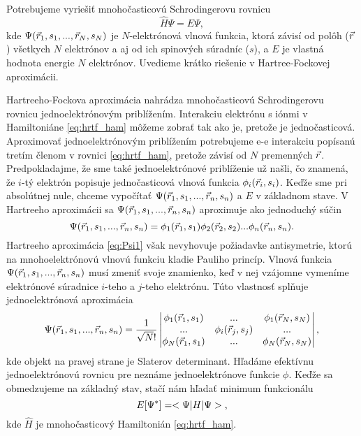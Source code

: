 Potrebujeme vyriešiť mnohočasticovú Schrodingerovu rovnicu
\begin{equation}
\label{eq:mohocasticovaschr}
\hat{H} \Psi = E \Psi,
\end{equation}
kde $\Psi(\vec{r}_1,s_1,...,\vec{r}_N,s_N)$ je $N$-elektrónová vlnová funkcia, ktorá závisí od polôh ($\vec{r}$) všetkych $N$ elektrónov
a aj od ich spinových súradníc ($s$), a $E$ je vlastná hodnota energie $N$ elektrónov. Uvedieme krátko riešenie v Hartree-Fockovej aproximácii.




Hartreeho-Fockova aproximácia nahrádza mnohočasticovú Schrodingerovu rovnicu jednoelektrónovým priblížením.
Interakciu elektrónu s iónmi v Hamiltoniáne \eqref{eq:hrtf_ham} môžeme zobrať tak ako je, pretože je jednočasticová.
Aproximovať jednoelektrónovým priblížením potrebujeme e-e interakciu popísanú tretím členom v rovnici \eqref{eq:hrtf_ham}, pretože závisí od $N$ premenných $\vec{r}$.
Predpokladajme, že sme také jednoelektrónové priblíženie už našli, čo znamená, že $i$-tý elektrón popisuje jednočasticová vlnová funkcia
$\phi_i(\vec{r}_i,s_i)$. Keďže sme pri absolútnej nule, chceme vypočítať $\Psi(\vec{r}_1,s_1,...,\vec{r}_n,s_n)$ a $E$  v základnom stave.
V Hartreeho aproximácii sa $\Psi(\vec{r}_1,s_1,...,\vec{r}_n,s_n)$ aproximuje ako jednoduchý súčin
\begin{equation}
\label{eq:Psi1}
\Psi(\vec{r}_1,s_1,...,\vec{r}_n,s_n)=\phi_1(\vec{r}_1,s_1)\phi_2(\vec{r}_2,s_2)...\phi_n(\vec{r}_n,s_n) \text{.}
\end{equation}
Hartreeho aproximácia \eqref{eq:Psi1} však nevyhovuje požiadavke antisymetrie, ktorú na mnohoelektrónovú vlnovú funkciu kladie Pauliho princíp.
Vlnová funkcia $\Psi(\vec{r}_1,s_1,...,\vec{r}_n,s_n)$ musí zmeniť svoje znamienko,
keď v nej vzájomne vymeníme elektrónové súradnice $i$-teho a $j$-teho elektrónu. Túto vlastnosť splňuje jednoelektrónová aproximácia
\begin{equation}
\label{eq:slatter}
\Psi(\vec{r}_1,s_1,...,\vec{r}_n,s_n)=\frac{1}{\sqrt N!}
\begin{vmatrix}
\phi_1(\vec{r}_1,s_1)& ... & \phi_1(\vec{r}_N,s_N) \\
...& \phi_i(\vec{r}_j,s_j)& ... \\
\phi_N(\vec{r}_1,s_1)& ... & \phi_N(\vec{r}_N,s_N)
\end{vmatrix}
\text{,}
\end{equation}
kde objekt na pravej strane je Slaterov determinant. Hľadáme efektívnu jednoelektrónovú rovnicu pre neznáme jednoelektrónove funkcie $\phi$.
Keďže sa obmedzujeme na základný stav,
stačí nám hľadať minimum funkcionálu
\begin{equation}
\label{eq:erg_func}
E[\Psi^*]=<\Psi|H|\Psi>\text{,}
\end{equation}
kde $\hat{H}$ je mnohočasticový Hamiltonián \eqref{eq:hrtf_ham}.

